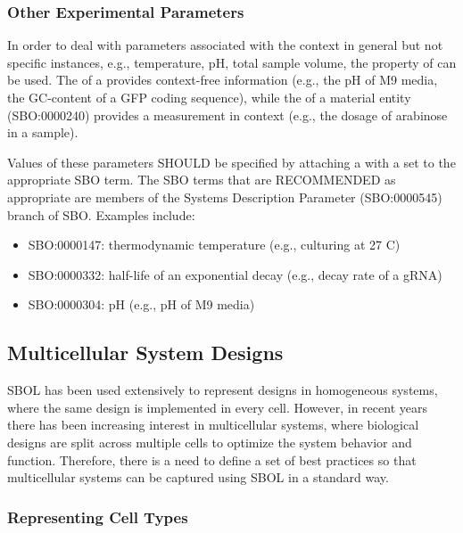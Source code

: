 \subsubsection{Other Experimental Parameters}

In order to deal with parameters associated with the context in general but not specific instances, e.g., temperature, pH, total sample volume, the  property of  can be used.  The  of a  provides context-free information (e.g., the pH of M9 media, the GC-content of a GFP coding sequence), while the  of a material entity (SBO:0000240)  provides a measurement in context (e.g., the dosage of arabinose in a sample).

Values of these parameters SHOULD be specified by attaching a  with a  set to the appropriate SBO term. The SBO terms that are RECOMMENDED as appropriate are members of the Systems Description Parameter (SBO:0000545) branch of SBO. Examples include:
\begin{itemize}
\item SBO:0000147: thermodynamic temperature (e.g., culturing at 27 C)
\item SBO:0000332: half-life of an exponential decay (e.g., decay rate of a gRNA)
\item SBO:0000304: pH (e.g., pH of M9 media)
\end{itemize}


\subsection{Multicellular System Designs}

SBOL has been used extensively to represent designs in homogeneous systems, where the same design is implemented in every cell. However, in recent years there has been increasing interest in multicellular systems, where biological designs are split across multiple cells to optimize the system behavior and function. Therefore, there is a need to define a set of best practices so that multicellular systems can be captured using SBOL in a standard way.

\subsubsection{Representing Cell Types}
\label{bp:cells}

